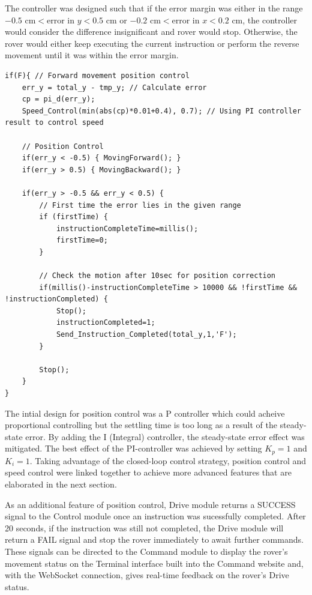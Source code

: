 \documentclass[11pt, a4paper]{article}
\begin{document}
The controller was designed such that if the error margin was either in the range $-0.5 \text{ cm} < \text{error in } y < 0.5 \text{ cm}$ or $-0.2 \text{ cm}  < \text{error in } x < 0.2\text{ cm}  $, the controller would consider the difference insignificant and rover would stop. Otherwise, the rover would either keep executing the current instruction or perform the reverse movement until it was within the error margin. 

\begin{lstlisting}
if(F){ // Forward movement position control
    err_y = total_y - tmp_y; // Calculate error
    cp = pi_d(err_y);
    Speed_Control(min(abs(cp)*0.01+0.4), 0.7); // Using PI controller result to control speed

    // Position Control
    if(err_y < -0.5) { MovingForward(); }
    if(err_y > 0.5) { MovingBackward(); }

    if(err_y > -0.5 && err_y < 0.5) {
        // First time the error lies in the given range
        if (firstTime) {
            instructionCompleteTime=millis();
            firstTime=0; 
        } 

        // Check the motion after 10sec for position correction
        if(millis()-instructionCompleteTime > 10000 && !firstTime && !instructionCompleted) {
            Stop();
            instructionCompleted=1;
            Send_Instruction_Completed(total_y,1,'F');        
        }

        Stop();
    }       
}
\end{lstlisting}

The intial design for position control was a P controller which could acheive proportional controlling but the settling time is too long as a result of the steady-state error. By adding the I (Integral) controller, the steady-state error effect was mitigated. The best effect of the PI-controller was achieved by setting $K_p = 1$ and $K_i = 1$. Taking advantage of the closed-loop control strategy, position control and speed control were linked together to achieve more advanced features that are elaborated in the next section. 

As an additional feature of position control, Drive module returns a SUCCESS signal to the Control module once an instruction was sucessfully completed. After 20 seconds, if the instruction was still not completed, the Drive module will return a FAIL signal and stop the rover immediately to await further commands. These signals can be directed to the Command module to display the rover's movement status on the Terminal interface built into the Command website and, with the WebSocket connection, gives real-time feedback on the rover's Drive status.  
\end{document}
